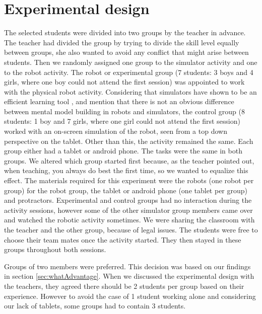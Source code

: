\chapter{Experimental design}
The selected students were divided into two groups by the teacher in advance. The teacher had divided the group by trying to divide the skill level equally between groups, she also wanted to avoid any conflict that might arise between students. Then we randomly assigned one group to the simulator activity and one to the robot activity. The robot or experimental group (7 students: 3 boys and 4 girls, where one boy could not attend the first session) was appointed to work with the physical robot activity. Considering that simulators have shown to be an efficient learning tool \cite{mitnik2009collaborative}, and \cite{papert1980mindstorms} mention that there is not an obvious difference between mental model building in robots and simulators, the control group (8 students: 1 boy and 7 girls, where one girl could not attend the first session) worked with an on-screen simulation of the robot, seen from a top down perspective on the tablet. Other than this, the activity remained the same. Each group either had a tablet or android phone. The tasks were the same in both groups. We altered which group started first because, as the teacher pointed out, when teaching, you always do best the first time, so we wanted to equalize this effect. The materials required for this experiment were the robots (one robot per group) for the robot group, the tablet or android phone (one tablet per group) and protractors. Experimental and control groups had no interaction during the activity sessions, however some of the other simulator group members came over and watched the robotic activity sometimes. We were sharing the classroom with the teacher and the other group, because of legal issues. The students were free to choose their team mates once the activity started. They then stayed in these groups throughout both sessions.

\bigskip\noindent
Groups of two members were preferred. This decision was based on our findings in section \ref{sec:whatAdvantage}. When we discussed the experimental design with the teachers, they agreed there should be 2 students per group based on their experience. However to avoid the case of 1 student working alone and considering our lack of tablets, some groups had to contain 3 students.
